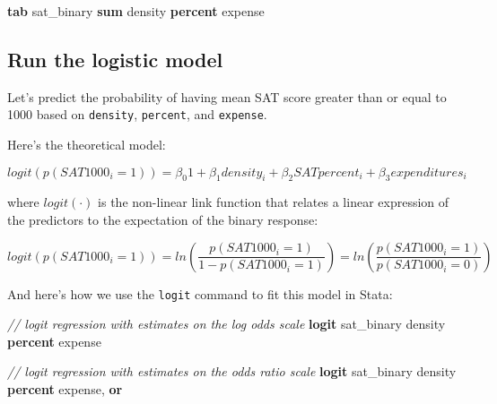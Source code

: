 \documentclass[
]{book}
\newenvironment{Shaded}{\begin{snugshade}}{\end{snugshade}}
\newcommand{\CommentTok}[1]{\textcolor[rgb]{0.56,0.35,0.01}{\textit{#1}}}
\newcommand{\KeywordTok}[1]{\textcolor[rgb]{0.13,0.29,0.53}{\textbf{#1}}}
\newcommand{\NormalTok}[1]{#1}
\begin{document}
\begin{Shaded}
\begin{Highlighting}[]
\KeywordTok{tab}\NormalTok{ sat\_binary}
\KeywordTok{sum}\NormalTok{ density }\KeywordTok{percent}\NormalTok{ expense }
\end{Highlighting}
\end{Shaded}

\hypertarget{run-the-logistic-model}{%
\subsection{Run the logistic model}\label{run-the-logistic-model}}

Let's predict the probability of having mean SAT score greater than or equal to 1000 based on \texttt{density}, \texttt{percent}, and \texttt{expense}.

Here's the theoretical model:

\begin{alert}

\[
logit(p(SAT1000_i = 1)) = \beta_{0}1 + \beta_1density_i + \beta_2SATpercent_i + \beta_3expenditures_i 
\]

\end{alert}

where \(logit(\cdot)\) is the non-linear link function that relates a linear expression of the predictors to the expectation of the binary response:

\begin{alert}

\[
logit(p(SAT1000_i = 1)) = ln \left( \frac{p(SAT1000_i = 1)}{1-p(SAT1000_i = 1)} \right) = ln \left( \frac{p(SAT1000_i = 1)}{p(SAT1000_i = 0)} \right)
\]

\end{alert}

And here's how we use the \texttt{logit} command to fit this model in Stata:

\begin{Shaded}
\begin{Highlighting}[]
\CommentTok{// logit regression with estimates on the log odds scale }
\KeywordTok{logit}\NormalTok{ sat\_binary density }\KeywordTok{percent}\NormalTok{ expense}

\CommentTok{// logit regression with estimates on the odds ratio scale }
\KeywordTok{logit}\NormalTok{ sat\_binary density }\KeywordTok{percent}\NormalTok{ expense, }\KeywordTok{or} 
\end{Highlighting}
\end{Shaded}
\end{document}

